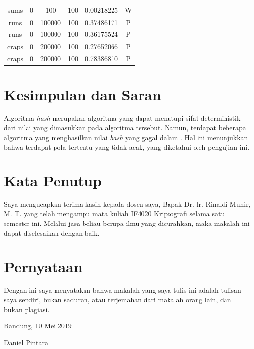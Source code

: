 \documentclass[conference]{IEEEtran}
\newcommand{\en}[1]
    {\foreignlanguage{english}{\textit{#1}}}
\begin{document}
\begin{table}[htbp]
\begin{center}
\begin{tabular}{|c|c|c|c|c|c|}
            sums           & 0            & 100          & 100          & 0.00218225            & W              \\
            runs           & 0            & 100000       & 100          & 0.37486171            & P              \\
            runs           & 0            & 100000       & 100          & 0.36175524            & P              \\
            craps          & 0            & 200000       & 100          & 0.27652066            & P              \\
            craps          & 0            & 200000       & 100          & 0.78386810            & P              \\
            \hline
        \end{tabular}
    \end{center}
\end{table}

\section{Kesimpulan dan Saran}

Algoritma \en{hash} merupakan algoritma yang dapat menutupi sifat deterministik dari nilai yang dimasukkan pada algoritma tersebut.
Namun, terdapat beberapa algoritma yang menghasilkan nilai \en{hash} yang gagal dalam .
Hal ini menunjukkan bahwa terdapat pola tertentu yang tidak acak, yang diketahui oleh pengujian ini.

\section{Kata Penutup}

Saya mengucapkan terima kasih kepada dosen saya, Bapak Dr. Ir. Rinaldi Munir, M. T. yang telah mengampu mata kuliah IF4020 Kriptografi selama satu semester ini.
Melalui jasa beliau berupa ilmu yang dicurahkan, maka makalah ini dapat diselesaikan dengan baik.




\section*{Pernyataan}

Dengan ini saya menyatakan bahwa makalah yang saya tulis ini adalah tulisan saya sendiri, bukan saduran, atau terjemahan dari makalah orang lain, dan bukan plagiasi.

\vspace{12pt}
\begin{flushright}
    Bandung, 10 Mei 2019

    \vspace{40pt}
    Daniel Pintara
\end{flushright}
\end{document}
